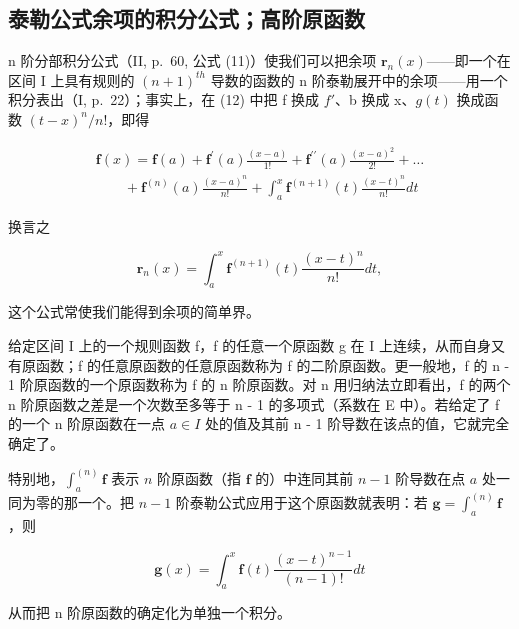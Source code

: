 \subsection{泰勒公式余项的积分公式；高阶原函数}

n 阶分部积分公式（II, p.~60, 公式 (11)）使我们可以把余项 \(\mathbf{r}_{n}(x)\)——即一个在区间 I 上具有规则的 \((n+1)^{th}\) 导数的函数的 n 阶泰勒展开中的余项——用一个积分表出（I, p.~22）；事实上，在 (12) 中把 f 换成 \(f'\)、b 换成 x、\(g(t)\) 换成函数 \((t-x)^{n}/n!\)，即得

\[
\begin{array}{l} \mathbf {f} (x) = \mathbf {f} (a) + \mathbf {f} ^ {\prime} (a) \frac {(x - a)}{1 !} + \mathbf {f} ^ {\prime \prime} (a) \frac {(x - a) ^ {2}}{2 !} + \dots \\ \qquad + \mathbf {f} ^ {(n)} (a) \frac {(x - a) ^ {n}}{n !} + \int_ {a} ^ {x} \mathbf {f} ^ {(n + 1)} (t) \frac {(x - t) ^ {n}}{n !} d t \end{array}\tag{17}
\]

换言之

\[
\mathbf {r} _ {n} (x) = \int_ {a} ^ {x} \mathbf {f} ^ {(n + 1)} (t) \frac {(x - t) ^ {n}}{n !} d t,\tag{18}
\]

这个公式常使我们能得到余项的简单界。

给定区间 I 上的一个规则函数 f，f 的任意一个原函数 g 在 I 上连续，从而自身又有原函数；f 的任意原函数的任意原函数称为 f 的二阶原函数。更一般地，f 的 n - 1 阶原函数的一个原函数称为 f 的 n 阶原函数。对 n 用归纳法立即看出，f 的两个 n 阶原函数之差是一个次数至多等于 n - 1 的多项式（系数在 E 中）。若给定了 f 的一个 n 阶原函数在一点 \(a \in I\) 处的值及其前 n - 1 阶导数在该点的值，它就完全确定了。

特别地，\(\int_{a}^{(n)}\mathbf{f}\) 表示 \(n\) 阶原函数（指 \(\mathbf{f}\) 的）中连同其前 \(n - 1\) 阶导数在点 \(a\) 处一同为零的那一个。把 \(n - 1\) 阶泰勒公式应用于这个原函数就表明：若 \(\mathbf{g} = \int_{a}^{(n)}\mathbf{f}\)，则

\[
\mathbf {g} (x) = \int_ {a} ^ {x} \mathbf {f} (t) \frac {(x - t) ^ {n - 1}}{(n - 1) !} d t\tag{19}
\]

从而把 n 阶原函数的确定化为单独一个积分。

